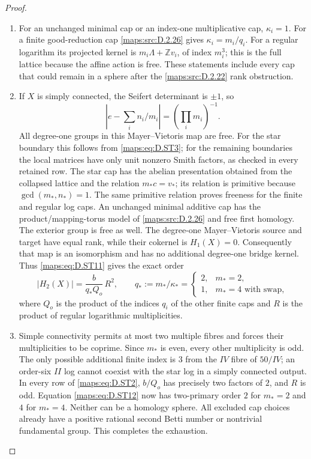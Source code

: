 \begin{proof}
\begin{enumerate}[label=\arabic*.,leftmargin=*]
\item For an unchanged minimal cap or an index-one multiplicative
cap, $\kappa_i=1$. For a finite good-reduction cap \ref{maps:src:D.2.26} gives
$\kappa_i=m_i/q_i$. For a regular logarithm its projected
kernel is $m_i\Lambda+\mathbb Z v_i$, of index $m_i^3$;
this is the full lattice because the affine action is free.
These statements include every cap that could remain in a
sphere after the \ref{maps:src:D.2.22} rank obstruction.

\item If $X$ is simply connected, the Seifert determinant is $\pm1$,
so
\[
 \left|e-\sum_i n_i/m_i\right|=(\prod_i m_i)^{-1}.
\]
All degree-one groups in this Mayer--Vietoris map are free.
For the star boundary this follows from \eqref{maps:eq:D.ST3}; for the
remaining boundaries the local matrices have only unit
nonzero Smith factors, as checked in every retained row.
The star cap has the abelian presentation obtained from the
collapsed lattice and the relation $m_*c=v_*$; its relation
is primitive because $\gcd(m_*,n_*)=1$. The same primitive
relation proves freeness for the finite and regular log caps.
An unchanged minimal additive cap has the product/mapping-torus
model of \ref{maps:src:D.2.26} and free first homology. The exterior group is
free as well. The degree-one Mayer--Vietoris source and target
have equal rank, while their cokernel is $H_1(X)=0$.
Consequently that map is an isomorphism and has no additional
degree-one bridge kernel.
Thus \eqref{maps:eq:D.ST11} gives the exact order
\[
 |H_2(X)|=\frac{b}{q_*Q_o}\,R^2,\qquad
 q_*:=m_*/\kappa_*=
 \begin{cases}2,&m_*=2,\\1,&m_*=4\text{ with swap},\end{cases} \tag{D.ST12}\label{maps:eq:D.ST12}
\]
where $Q_o$ is the product of the indices $q_i$ of the other
finite caps and $R$ is the product of regular logarithmic
multiplicities.

\item Simple connectivity permits at most two multiple fibres and
forces their multiplicities to be coprime. Since $m_*$ is
even, every other multiplicity is odd. The only possible
additional finite index is $3$ from the $IV$ fibre of $50/IV$;
an order-six $II$ log cannot coexist with the star log in a
simply connected output. In every row of \eqref{maps:eq:D.ST2},
$b/Q_o$ has precisely two factors of $2$, and $R$ is odd.
Equation \eqref{maps:eq:D.ST12} now has two-primary order $2$ for $m_*=2$
and $4$ for $m_*=4$. Neither can be a homology sphere.
All excluded cap choices already have a positive rational
second Betti number or nontrivial fundamental group. This
completes the exhaustion.
\end{enumerate}
\end{proof}

